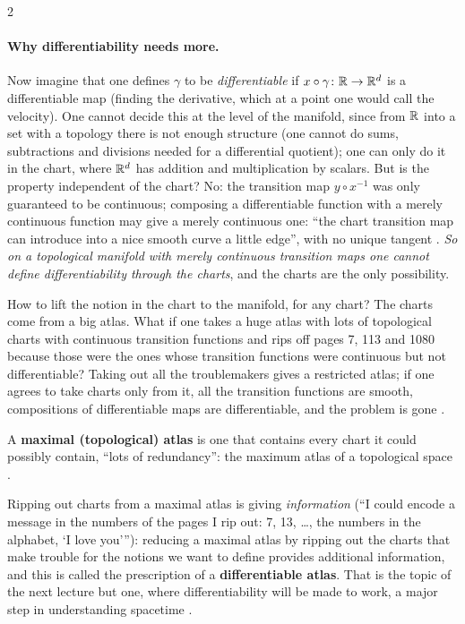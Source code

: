 \begin{paracol}{2}
\paragraph{Why differentiability needs more.} Now imagine that one defines $\gamma$ to be \emph{differentiable} if $x\circ\gamma\colon\mathbb{R}\to\mathbb{R}^d$ is a differentiable map (finding the derivative, which at a point one would call the velocity). One cannot decide this at the level of
the manifold, since from $\mathbb{R}$ into a set with a topology there is not enough structure (one cannot do sums, subtractions and divisions needed for a differential quotient); one can only do it in the chart, where $\mathbb{R}^d$ has addition and multiplication by scalars. But is the property independent of the chart?
No: the transition map $y\circ x^{-1}$ was only guaranteed to be continuous; composing a differentiable function with a merely continuous function may give a merely continuous one: ``the chart transition map can introduce into a nice smooth curve a little edge'', with no unique tangent
.
\emph{So on a topological manifold with merely continuous transition maps one cannot define differentiability through the charts}, and the charts are the only possibility.

How to lift the notion in the chart to the manifold, for any chart? The charts come from a big atlas. What if one takes a huge atlas with lots of topological charts with continuous transition functions and rips off pages 7, 113 and 1080 because those were the ones whose transition
functions were continuous but not differentiable? Taking out all the troublemakers gives a restricted atlas; if one agrees to take charts only from it, all the transition functions are smooth, compositions of differentiable maps are differentiable, and the problem is gone
.

\begin{definition}\label{def:c02-maximal}
A \textbf{maximal (topological) atlas} is one that contains every chart it could possibly contain, ``lots of redundancy'': the maximum atlas of a topological space .
\end{definition}
Ripping out charts from a maximal atlas is giving \emph{information} (``I could encode a message in the numbers of the pages I rip out: 7, 13, \dots, the numbers in the alphabet, `I love you'''): reducing a maximal atlas by ripping out the charts that make trouble for the notions we want to define provides
additional information, and this is called the prescription of a \textbf{differentiable atlas}. That is the topic of the next lecture but one, where differentiability will be made to work, a major step in understanding spacetime
.


\end{paracol}
